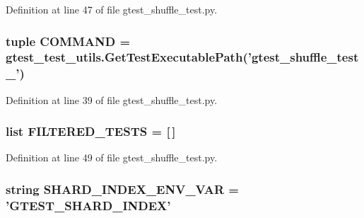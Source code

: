 \-Definition at line 47 of file gtest\-\_\-shuffle\-\_\-test.\-py.

\hypertarget{namespacegtest__shuffle__test_add010199942a26d17bd560c1ce462eeb}{
\subsubsection[{\-C\-O\-M\-M\-A\-N\-D}]{\setlength{\rightskip}{0pt plus 5cm}tuple {\bf \-C\-O\-M\-M\-A\-N\-D} = {\bf gtest\-\_\-test\-\_\-utils.\-Get\-Test\-Executable\-Path}('gtest\-\_\-shuffle\-\_\-test\-\_\-')}}\label{d3/d15/namespacegtest__shuffle__test_add010199942a26d17bd560c1ce462eeb}


\-Definition at line 39 of file gtest\-\_\-shuffle\-\_\-test.\-py.

\hypertarget{namespacegtest__shuffle__test_aba3048b72eb8c3d3541edeeb029583fe}{
\subsubsection[{\-F\-I\-L\-T\-E\-R\-E\-D\-\_\-\-T\-E\-S\-T\-S}]{\setlength{\rightskip}{0pt plus 5cm}list {\bf \-F\-I\-L\-T\-E\-R\-E\-D\-\_\-\-T\-E\-S\-T\-S} = \mbox{[}$\,$\mbox{]}}}\label{d3/d15/namespacegtest__shuffle__test_aba3048b72eb8c3d3541edeeb029583fe}


\-Definition at line 49 of file gtest\-\_\-shuffle\-\_\-test.\-py.

\hypertarget{namespacegtest__shuffle__test_a8eb464868f4a78b232279d364ad58b55}{
\subsubsection[{\-S\-H\-A\-R\-D\-\_\-\-I\-N\-D\-E\-X\-\_\-\-E\-N\-V\-\_\-\-V\-A\-R}]{\setlength{\rightskip}{0pt plus 5cm}string {\bf \-S\-H\-A\-R\-D\-\_\-\-I\-N\-D\-E\-X\-\_\-\-E\-N\-V\-\_\-\-V\-A\-R} = '\-G\-T\-E\-S\-T\-\_\-\-S\-H\-A\-R\-D\-\_\-\-I\-N\-D\-E\-X'}}\label{d3/d15/namespacegtest__shuffle__test_a8eb464868f4a78b232279d364ad58b55}



